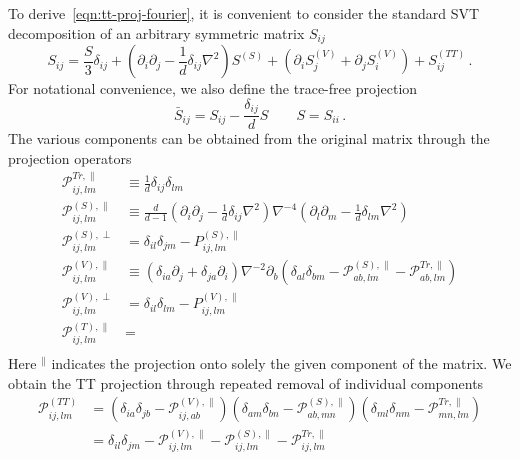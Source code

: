 \documentclass{revtex4}
\newcommand{\proj}{\ensuremath{\mathcal{P}}}
\begin{document}
To derive~\eqref{eqn:tt-proj-fourier}, it is convenient to consider the standard SVT decomposition of an arbitrary symmetric matrix $S_{ij}$
\begin{equation}
  S_{ij} = \frac{S}{3}\delta_{ij} + \left(\partial_i\partial_j - \frac{1}{d}\delta_{ij}\nabla^2\right)S^{(S)} + (\partial_iS_j^{(V)} + \partial_jS^{(V)}_i) + S_{ij}^{(TT)} \, .
\end{equation}
For notational convenience, we also define the trace-free projection
\begin{equation}
  \bar{S}_{ij} = S_{ij} - \frac{\delta_{ij}}{d}S \qquad S = S_{ii} \, .
\end{equation}
The various components can be obtained from the original matrix through the projection operators
\begin{subequations}
\begin{align}
  \proj^{Tr,\parallel}_{ij,lm} &\equiv \frac{1}{d}\delta_{ij}\delta_{lm} \\
  \proj^{(S),\parallel}_{ij,lm} &\equiv \frac{d}{d-1}\left(\partial_i\partial_j - \frac{1}{d}\delta_{ij}\nabla^2\right)\nabla^{-4}\left(\partial_l\partial_m - \frac{1}{d}\delta_{lm}\nabla^2\right) \\
  \proj^{(S),\perp}_{ij,lm} &= \delta_{il}\delta_{jm} - P^{(S),\parallel}_{ij,lm} \\
  \proj^{(V),\parallel}_{ij,lm} &\equiv (\delta_{ia}\partial_j + \delta_{ja}\partial_i)\nabla^{-2}\partial_b\left(\delta_{al}\delta_{bm} - \proj^{(S),\parallel}_{ab,lm} - \proj^{Tr,\parallel}_{ab,lm}\right) \\
  \proj^{(V),\perp}_{ij,lm} &= \delta_{il}\delta_{lm} - P_{ij,lm}^{(V),\parallel} \\
  \proj^{(T),\parallel}_{ij,lm} &= \\
\end{align}
\end{subequations}
Here ${}^\parallel$ indicates the projection onto solely the given component of the matrix.
We obtain the TT projection through repeated removal of individual components
\begin{align}
  \mathcal{P}_{ij,lm}^{(TT)} &= \left(\delta_{ia}\delta_{jb} - \proj^{(V),\parallel}_{ij,ab}\right)\left(\delta_{am}\delta_{bn}-\proj_{ab,mn}^{(S),\parallel}\right)\left(\delta_{ml}\delta_{nm}-\proj_{mn,lm}^{Tr,\parallel}\right) \\
  &=  \delta_{il}\delta_{jm} - \proj_{ij,lm}^{(V),\parallel} - \proj_{ij,lm}^{(S),\parallel} - \proj_{ij,lm}^{Tr,\parallel}
\end{align}
\end{document}
